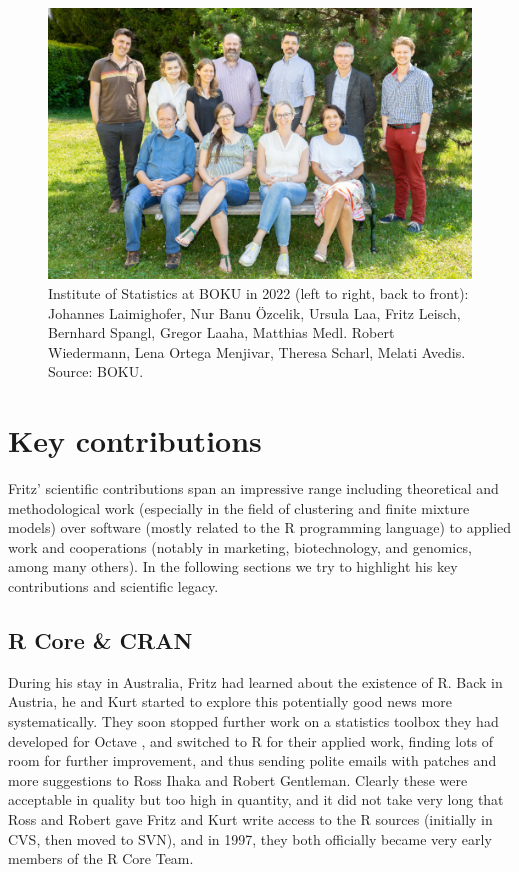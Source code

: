 \begin{figure}[t!]

{\centering \includegraphics[width=0.83\linewidth]{figures/img-boku} 

}

\caption{Institute of Statistics at BOKU in 2022 (left to right, back to front): Johannes Laimighofer, Nur Banu Özcelik, Ursula Laa, Fritz Leisch, Bernhard Spangl, Gregor Laaha, Matthias Medl. Robert Wiedermann, Lena Ortega Menjivar, Theresa Scharl, Melati Avedis. Source: BOKU.}\label{fig:boku}
\end{figure}

\section{Key contributions}\label{key-contributions}

Fritz' scientific contributions span an impressive range including
theoretical and methodological work (especially in the field of clustering
and finite mixture models) over software (mostly related to the R
programming language) to applied work and cooperations (notably in
marketing, biotechnology, and genomics, among many others). In the
following sections we try to highlight his key contributions and
scientific legacy.

\subsection{R Core \& CRAN}\label{r-core-cran}

During his stay in Australia, Fritz had learned about the existence of
R. Back in Austria, he and Kurt started to explore this potentially
good news more systematically. They soon stopped further work on a
statistics toolbox they had developed for Octave \citep{Eaton+Bateman+Hauberg:2024},
and switched to R for their applied work, finding lots of room for
further improvement, and thus sending polite emails with patches and
more suggestions to Ross Ihaka and Robert Gentleman. Clearly these were
acceptable in quality but too high in quantity, and it did not take very
long that Ross and Robert gave Fritz and Kurt write access to the R
sources (initially in CVS, then moved to SVN), and in 1997, they both
officially became very early members of the R Core Team.

